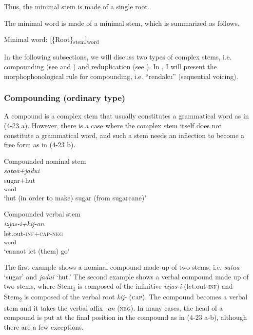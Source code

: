 Thus, the minimal stem is made of a single root.

The minimal word is made of a minimal stem, which is summarized as follows.

\ea  Minimal word: [\{Root\}\textsubscript{stem}]\textsubscript{word} \label{ex:4.22}\z

In the following subsections, we will discuss two types of complex stems, i.e. compounding (see  and ) and reduplication (see ). In , I will present the morphophonological rule for compounding, i.e. “rendaku” (sequential voicing).

\subsubsection{Compounding (ordinary type)}\label{sec:4.2.3.1}

A compound is a complex stem that usually constitutes a grammatical word as in (4-23 a). However, there is a case where the complex stem itself does not constitute a grammatical word, and such a stem needs an inflection to become a free form as in (4-23 b).

\ea \label{ex:4.23}
\ea Compounded nominal stem \label{ex:4.23a}\\
 \glll \textit{sataa+jadui}\\
    sugar+hut\\
    [\{Stem\textsubscript{1}+Stem\textsubscript{2}\}\textsubscript{compound}]\textsubscript{word}\\
    \glt ‘hut (in order to make) sugar (from sugarcane)’
    
\ex Compounded verbal stem\\
\glll \textit{izjas-i+kij-an}\\
    let.out-\textsc{inf}+\textsc{cap}-\textsc{neg}\\
    [\{Stem\textsubscript{1}+Stem\textsubscript{2}\}\textsubscript{compound}{}-Affix]\textsubscript{word}\\
\glt    ‘cannot let (them) go’
\z
\z

The first example shows a nominal compound made up of two stems, i.e. \textit{sataa} ‘sugar’ and \textit{jadui} ‘hut.’ The second example shows a verbal compound made up of two stems, where Stem\textsubscript{1} is composed of the infinitive \textit{izjas-i} (let.out-\textsc{inf}) and Stem\textsubscript{2} is composed of the verbal root \textit{kij-} (\textsc{cap}). The compound becomes a verbal stem and it takes the verbal affix \textit{-an} (\textsc{neg}). In many cases, the head of a compound is put at the final position in the compound as in (4-23 a-b), although there are a few exceptions.

